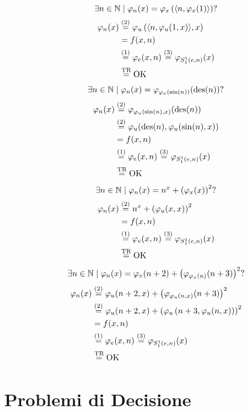 $$ \exists n \in \mathbb{N} \mid \varphi_n (x) = \varphi_x \left(\langle n, \varphi_x (1) \rangle \right) ?$$
\begin{align*}
	\varphi_n (x) & \stackrel{(2)}{=} \varphi_u \left(\langle n, \varphi_u (1, x) \rangle, x\right) \\
	& = f(x,n) \\
	& \stackrel{(1)}{=} \varphi_e (x,n) \stackrel{(3)}{=} \varphi_{S_1^1 (e,n)} (x) \\
	& \stackrel{\text{TR}}{=} \text{OK}
\end{align*}
$$ \exists n \in \mathbb{N} \mid \varphi_n (x) = \varphi_{\varphi_x (\sin (n))} (\operatorname{des} (n)) ? $$
\begin{align*}
	\varphi_n (x) & \stackrel{(2)}{=} \varphi_{\varphi_u (\sin (n), x)} (\operatorname{des} (n)) \\
	& \stackrel{(2)}{=} \varphi_u (\operatorname{des} (n), \varphi_u (\sin (n), x)) \\
	& = f(x,n) \\
	& \stackrel{(1)}{=} \varphi_e (x,n) \stackrel{(3)}{=} \varphi_{S_1^1 (e,n)} (x) \\
	& \stackrel{\text{TR}}{=} \text{OK}
\end{align*}
$$ \exists n \in \mathbb{N} \mid \varphi_n (x) = n^x + \left(\varphi_x (x)\right)^2 ?$$
\begin{align*}
	\varphi_n (x) & \stackrel{(2)}{=} n^x + \left(\varphi_u (x,x)\right)^2 \\
	& = f(x,n) \\
	& \stackrel{(1)}{=} \varphi_e (x,n) \stackrel{(3)}{=} \varphi_{S_1^1 (e,n)} (x) \\
	& \stackrel{\text{TR}}{=} \text{OK} \\
\end{align*}
$$ \exists n \in \mathbb{N} \mid \varphi_n (x) = \varphi_x (n + 2) + \left(\varphi_{\varphi_x (n)} (n+3)\right)^2 ? $$
\begin{align*}
	\varphi_n (x) & \stackrel{(2)}{=} \varphi_u (n + 2, x) + \left(\varphi_{\varphi_u (n, x)} (n + 3)\right)^2 \\
	& \stackrel{(2)}{=} \varphi_u (n+2, x) + \left(\varphi_u \left(n + 3, \varphi_u (n,x)\right)\right)^2  \\
	& = f(x,n) \\
	& \stackrel{(1)}{=} \varphi_e (x,n) \stackrel{(3)}{=} \varphi_{S_1^1 (e,n)} (x) \\
	& \stackrel{\text{TR}}{=} \text{OK}
\end{align*}


\section{Problemi di Decisione}

